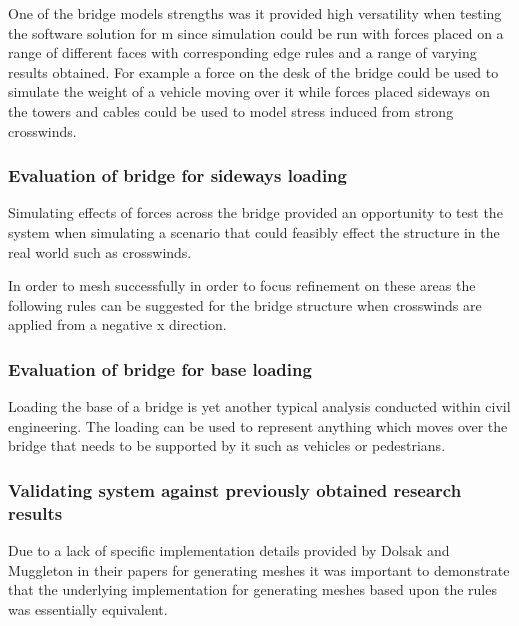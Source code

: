 \newpage


\noindent
One of the bridge models strengths was it provided high versatility when testing the software solution for m since simulation could be run with forces placed on a range of different faces with corresponding edge rules and a range of varying results obtained. For example a force on the desk of the bridge could be used to simulate the weight of a vehicle moving over it while forces placed sideways on the towers and cables could be used to model stress induced from strong crosswinds.

\subsubsection{Evaluation of bridge for sideways loading}
Simulating effects of forces across the bridge provided an opportunity  to test the system when simulating a scenario that could feasibly effect the structure in the real world such as crosswinds.


\cite{CrosswindsOnSuspensionBridges}

In order to mesh successfully in order to focus refinement on these areas the following rules can be suggested for the bridge structure when crosswinds are applied from a negative x direction.



\subsubsection{Evaluation of bridge for base loading}
Loading the base of a bridge is yet another typical analysis conducted within civil engineering. The loading can be used to represent anything which moves over the bridge that needs to be supported by it such as vehicles or pedestrians. 


\subsubsection{Validating system against previously obtained research results}
Due to a lack of specific implementation details provided by Dolsak and Muggleton in their papers for generating meshes it was important to demonstrate that the underlying implementation for generating meshes based upon the rules was essentially equivalent. \\ 


